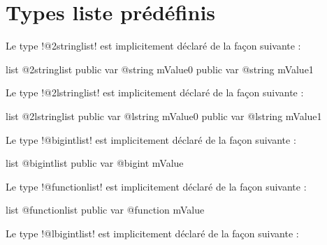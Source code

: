 \section{Types liste prédéfinis}


Le type \ggs!@2stringlist! est implicitement déclaré de la façon suivante :

\begin{galgasbox}
list @2stringlist {
  public var @string mValue0
  public var @string mValue1
}
\end{galgasbox}









Le type \ggs!@2lstringlist! est implicitement déclaré de la façon suivante :

\begin{galgasbox}
list @2lstringlist {
  public var @lstring mValue0
  public var @lstring mValue1
}
\end{galgasbox}









Le type \ggs!@bigintlist! est implicitement déclaré de la façon suivante :

\begin{galgasbox}
list @bigintlist {
  public var @bigint mValue
}
\end{galgasbox}









Le type \ggs!@functionlist! est implicitement déclaré de la façon suivante :

\begin{galgasbox}
list @functionlist {
  public var @function mValue
}
\end{galgasbox}









Le type \ggs!@lbigintlist! est implicitement déclaré de la façon suivante :

